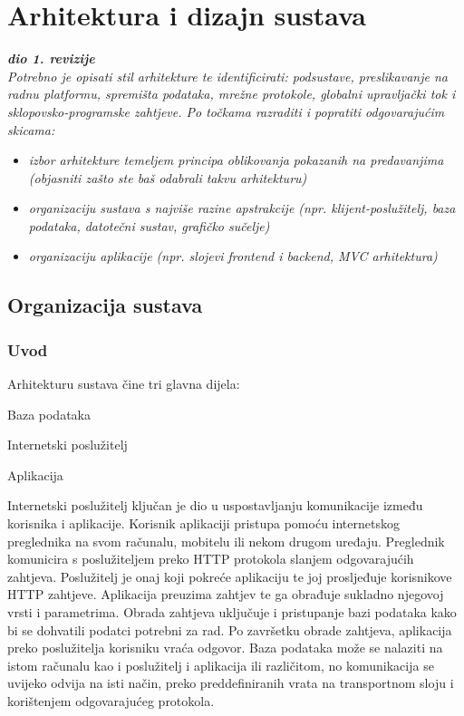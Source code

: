 \chapter{Arhitektura i dizajn sustava}
		
		\textbf{\textit{dio 1. revizije}}\\

		\textit{ Potrebno je opisati stil arhitekture te identificirati: podsustave, preslikavanje na radnu platformu, spremišta podataka, mrežne protokole, globalni upravljački tok i sklopovsko-programske zahtjeve. Po točkama razraditi i popratiti odgovarajućim skicama:}
	\begin{itemize}
		\item 	\textit{izbor arhitekture temeljem principa oblikovanja pokazanih na predavanjima (objasniti zašto ste baš odabrali takvu arhitekturu)}
		\item 	\textit{organizaciju sustava s najviše razine apstrakcije (npr. klijent-poslužitelj, baza podataka, datotečni sustav, grafičko sučelje)}
		\item 	\textit{organizaciju aplikacije (npr. slojevi frontend i backend, MVC arhitektura) }		
	\end{itemize}
		
		\section{Organizacija sustava}
			\subsection{Uvod}
				Arhitekturu sustava čine tri glavna dijela:
				\begin{packed_item}
					\item Baza podataka
					\item Internetski poslužitelj
					\item Aplikacija
				\end{packed_item}
			
				Internetski poslužitelj ključan je dio u uspostavljanju komunikacije između korisnika i aplikacije. Korisnik aplikaciji pristupa pomoću internetskog preglednika na svom računalu, mobitelu ili nekom drugom uređaju. Preglednik komunicira s poslužiteljem preko HTTP protokola slanjem odgovarajućih zahtjeva. Poslužitelj je onaj koji pokreće aplikaciju te joj prosljeđuje korisnikove HTTP zahtjeve.
				\linebreak
				Aplikacija preuzima zahtjev te ga obrađuje sukladno njegovoj vrsti i parametrima. Obrada zahtjeva uključuje i pristupanje bazi podataka kako bi se dohvatili podatci potrebni za rad. Po završetku obrade zahtjeva, aplikacija preko poslužitelja korisniku vraća odgovor.
				\linebreak
				Baza podataka može se nalaziti na istom računalu kao i poslužitelj i aplikacija ili različitom, no komunikacija se uvijeko odvija na isti način, preko preddefiniranih vrata na transportnom sloju i korištenjem odgovarajućeg protokola.
